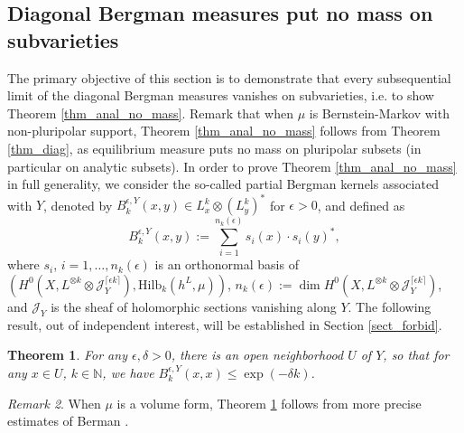 \documentclass[12pt]{article}
\numberwithin{equation}{section}
\theoremstyle{theorem}
\newtheorem{thm}{Theorem}[section]
\theoremstyle{definition}
\theoremstyle{remark}
\newtheorem{rem}[thm]{Remark}
\newcommand{\nat}{\mathbb{N}}
\begin{document}
	\subsection{Diagonal Bergman measures put no mass on subvarieties}\label{sect_bergm_anal}
	\begin{sloppypar} 
	The primary objective of this section is to demonstrate that every subsequential limit of the diagonal Bergman measures vanishes on subvarieties, i.e. to show Theorem \ref{thm_anal_no_mass}. 
	Remark that when $\mu$ is Bernstein-Markov with non-pluripolar support, Theorem \ref{thm_anal_no_mass} follows from Theorem \ref{thm_diag}, as equilibrium measure puts no mass on pluripolar subsets (in particular on analytic subsets).
	In order to prove Theorem \ref{thm_anal_no_mass} in full generality, we consider the so-called partial Bergman kernels associated with $Y$, denoted by  $B_k^{\epsilon, Y}(x, y) \in L^k_x \otimes (L^k_y)^*$ for $\epsilon > 0$, and defined as
	\begin{equation}\label{eq_bergm_kern_part}
		B_k^{\epsilon, Y}(x, y) := \sum_{i = 1}^{n_k(\epsilon)} s_i(x) \cdot s_i(y)^*,
	\end{equation}
	where $s_i$, $i = 1, \ldots, n_k(\epsilon)$ is an orthonormal basis of $(H^0(X, L^{\otimes k} \otimes \mathcal{J}_{Y}^{\lceil \epsilon k \rceil}), {\textrm{Hilb}}_k(h^L, \mu))$, $n_k(\epsilon) := \dim H^0(X, L^{\otimes k} \otimes \mathcal{J}_{Y}^{\lceil \epsilon k \rceil})$, and $\mathcal{J}_{Y}$ is the sheaf of holomorphic sections vanishing along $Y$.
	The following result, out of independent interest, will be established in Section \ref{sect_forbid}.
	\end{sloppypar}
	\par 
	\begin{thm}\label{thm_forbid_region}
		For any $\epsilon, \delta > 0$, there is an open neighborhood $U$ of $Y$, so that for any $x \in U$, $k \in \nat$, we have $B_k^{\epsilon, Y}(x, x) \leq \exp(- \delta k)$.
	\end{thm}
	\begin{rem}
		When $\mu$ is a volume form, Theorem \ref{thm_forbid_region} follows from more precise estimates of Berman \cite[Lemma 4.1]{BermanEnvProj}.
	\end{rem}
\end{document}
